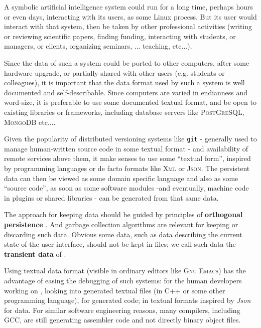 \documentclass{svproc}
\begin{document}
A symbolic artificial intelligence system could run for a long time,
perhaps hours or even days, interacting with its users, as some Linux
process. But its user would interact with that system, then be taken
by other professional activities (writing or reviewing scientific
papers, finding funding, interacting with students, or managers, or
clients, organizing seminars, ... teaching, etc...).

Since the data of such a system could be ported to other computers,
after some hardware upgrade, or partially shared with other users
(e.g. students or colleagues), it is important that the data format
used by such a system is well documented and self-describable. Since
computers are varied in endianness and word-size, it is preferable to
use some documented textual format, and be open to existing libraries
or frameworks, including database servers like \textsc{PostGreSQL},
\textsc{MongoDB} etc.... \cite{Date:2005:Database-in-Depth}

Given the popularity of distributed versioning systems like
\texttt{git} - generally used to manage human-written source code in
some textual format - and availability of remote services above them,
it make senses to use some ``textual form'', inspired by programming
languages or de facto formats like \textsc{Xml} or \textsc{Json}. The
persistent data can then be viewed as some domain specific language
\cite{Fowler:2010:domain} \cite{Starynkevitch-DSL2011} and also as
some ``source code'', as soon as some software modules -and
eventually, machine code in plugins or shared libraries
\cite{drepper:2011:write-shared-lib} - can be generated from that same
data.

The approach for keeping data should be guided by principles of
\textbf{orthogonal persistence} \cite{dearle:2009:orthogonal}. And
garbage collection algorithms \cite{jones:2016:gchandbook} are
relevant for keeping or discarding such data. Obvious some data, such
as data describing the current state of the user interface, should not
be kept in files; we call such data the \textbf{transient data} of
\RefPerSys.

Using textual data format (visible in ordinary editors like
\textsc{Gnu Emacs}) has the advantage of easing the debugging of such
systems: for the human developers working on \RefPerSys, looking into
generated textual files (in C++ or some other programming language),
for generated code; in textual formats inspired by \textit{Json} for
data. For similar software engineering reasons, many compilers,
including GCC, are still generating assembler code and not directly
binary object files.
\end{document}
